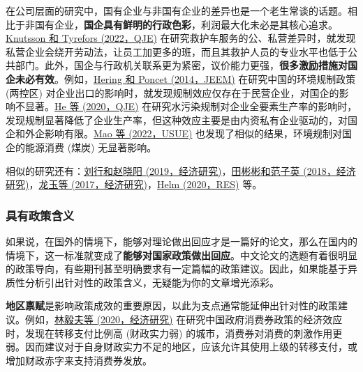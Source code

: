 \documentclass[11pt,a4paper]{ctexart}
\begin{document}
在公司层面的研究中，国有企业与非国有企业的差异也是一个老生常谈的话题。相比于非国有企业，\textbf{国企具有鲜明的行政色彩}，利润最大化未必是其核心追求。\href{https://doi.org/10.1093/qje/qjac014}{Knutsson
和 Tyrefors (2022，QJE)}
在研究救护车服务的公、私营差异时，就发现私营企业会绕开劳动法，让员工加更多的班，而且其救护人员的专业水平也低于公共部门。此外，国企与行政机关联系更为紧密，议价能力更强，\textbf{很多激励措施对国企未必有效}。例如，\href{https://doi.org/10.1016/j.jeem.2014.06.005}{Hering
和 Poncet (2014，JEEM)} 在研究中国的环境规制政策 (两控区)
对企业出口的影响时，就发现规制效应仅存在于民营企业，对国企的影响不显著。\href{https://doi.org/10.1093/qje/qjaa024}{He
等 (2020，QJE)}
在研究水污染规制对企业全要素生产率的影响时，发现规制显著降低了企业生产率，但这种效应主要是由内资私有企业驱动的，对国企和外企影响有限。\href{https://www.sciencedirect.com/science/article/pii/S0166046222000898?casa_token=cpCUnYcqVisAAAAA:aUtmewxVkruyOc2rttWy3_sy9IqKWVQyC20YRtvJ7qWrR1CxWk9LSJf8FXUuJ2uqr1ayFgR7Wg}{Mao
等 (2022，USUE)} 也发现了相似的结果，环境规制对国企的能源消费 (煤炭)
无显著影响。

相似的研究还有：\href{https://t.cnki.net/kcms/detail?v=3uoqIhG8C44YLTlOAiTRKibYlV5Vjs7iLik5jEcCI09uHa3oBxtWoHGwy9XepWzLaLj1SleDlG7oY-wqM4827-s4LJuicRJ7&uniplatform=NZKPT}{刘行和赵晓阳
(2019，经济研究)}，\href{https://t.cnki.net/kcms/detail?v=3uoqIhG8C44YLTlOAiTRKibYlV5Vjs7i0-kJR0HYBJ80QN9L51zrPzWAZGIoVH-LuC0y0mm3Y_jCaB49BQt8a31XH9TeZw7t&uniplatform=NZKPT}{田彬彬和范子英
(2018，经济研究)}，\href{https://t.cnki.net/kcms/detail?v=3uoqIhG8C44YLTlOAiTRKibYlV5Vjs7iAEhECQAQ9aTiC5BjCgn0Rv4-PadGuYKxi-ehg66ZyXG4s6W1kH_ss04zryqYfzfV&uniplatform=NZKPT}{龙玉等
(2017，经济研究)}，\href{https://doi.org/10.1093/restud/rdz056}{Helm
(2020，RES)} 等。

\subsubsection{具有政策含义}

如果说，在国外的情境下，能够对理论做出回应才是一篇好的论文，那么在国内的情境下，这一标准就变成了\textbf{能够对国家政策做出回应}。中文论文的选题有着很明显的政策导向，有些期刊甚至明确要求有一定篇幅的政策建议。因此，如果能基于异质性分析引出针对性的政策含义，无疑能为你的文章增光添彩。

\textbf{地区禀赋}是影响政策成效的重要原因，以此为支点通常能延伸出针对性的政策建议。例如，\href{https://t.cnki.net/kcms/detail?v=3uoqIhG8C44YLTlOAiTRKibYlV5Vjs7i8oRR1PAr7RxjuAJk4dHXoqec8_rQcQP1REl-m3e3bTVUs6Vtextbfltqj3pnJ1DZeYnJ&uniplatform=NZKPT}{林毅夫等
(2020，经济研究)}
在研究中国政府消费券政策的经济效应时，发现在转移支付比例高 (财政实力弱)
的城市，消费券对消费的刺激作用更弱。因而建议对于自身财政实力不足的地区，应该允许其使用上级的转移支付，或增加财政赤字来支持消费券发放。
\end{document}

